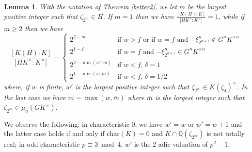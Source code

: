 \documentclass[11pt, a4paper]{amsart}
\newtheorem {lem}[thm]{Lemma}
\theoremstyle{definition}
\newcommand{\Q}{\mathbb{Q}}
\newcommand{\ch}{\mathrm{char}}
\renewcommand{\geq}{\geqslant}
\begin{document}
\begin{lem}\label{lembetter2}
With the notation of Theorem \ref{better2}, we let $m$ be the largest positive integer such that $\zeta_{2^m}\in H$. If $m=1$ then we have 
$\frac{[K(H):K]}{|HK^\times:K^\times|}=1$, while if $m\geq 2$ then we have 
$$\frac{[K(H):K]}{|HK^\times:K^\times|}=\begin{cases} 
2^{2-m} & \text{if $w>f$ or if $w=f$ and $-\xi_{2^{w+1}}^n\notin G^nK^{\times n}$}\\
2^{1-f} & \text{if $w=f$ and $-\xi_{2^{w+1}}^n\in G^nK^{\times n}$}\\
2^{2-\min(w',m)} & \text{if $w<f$, $\delta=1$}\\
2^{1-\min(w,m)} & \text{if $w<f$, $\delta=1/2$}\end{cases}$$
where, if $w$ is finite, $w'$ is the largest positive integer such that $\zeta_{2^{w'}}\in K(\zeta_4)^\times$.
In the last case we have $m=\max(w, \overline{m})$ where $\overline{m}$ is the largest integer such that $\zeta_{2^{\overline{m}}}\in \mu_n(GK^\times)$.
\end{lem}

We observe the following: in characteristic $0$, we have $w'=w$ or $w'=w+1$ and the latter case holds if and only if $\ch(K)=0$ and $K\cap \Q(\zeta_{{2^\infty}})$ is not totally real; in odd characteristic $p\equiv 3 \bmod 4$, $w'$ is the $2$-adic valuation of $p^2-1$. 
\end{document}

